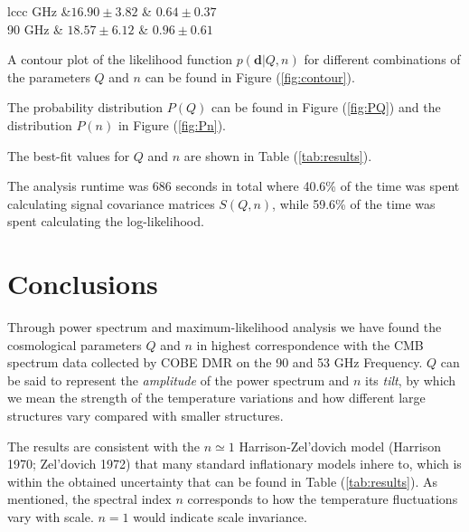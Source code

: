 \documentclass{emulateapj}
\begin{document}
\begin{deluxetable}{lccc}
	\tablecaption{\label{tab:results}}
	 GHz &$16.90 \pm 3.82$ & $0.64 \pm  0.37$ \\
	90 GHz & $ 18.57 \pm 6.12$ & $0.96 \pm 0.61$  \\
		\enddata
\end{deluxetable}

A contour plot of the likelihood function $p(\textbf{d}|Q,n)$ for different combinations of the parameters $Q$ and $n$ can be found in Figure (\ref{fig:contour}).

The probability distribution $P(Q)$ can be found in Figure (\ref{fig:PQ}) and the distribution $P(n)$ in Figure (\ref{fig:Pn}).

The best-fit values for $Q$ and $n$ are shown in Table (\ref{tab:results}).
 
The analysis runtime was 686 seconds in total where 40.6\% of the time was spent calculating signal covariance matrices $S(Q,n)$, while 59.6\% of the time was spent calculating the log-likelihood. 

 


\section{Conclusions}
\label{sec:conclusions}

Through power spectrum and maximum-likelihood analysis we have found the cosmological parameters $Q$ and $n$ in highest correspondence with the CMB spectrum data collected by COBE DMR on the 90 and 53 GHz Frequency. $Q$ can be said to represent the \textit{amplitude} of the power spectrum and $n$ its \textit{tilt}, by which we mean the strength of the temperature variations and how different large structures vary compared with smaller structures.

The results are consistent with the $n \simeq 1$ Harrison-Zel'dovich model (Harrison 1970; Zel'dovich 1972) that many standard inflationary models inhere to, which is within the obtained uncertainty that can be found in Table (\ref*{tab:results}). As mentioned, the spectral index $n$ corresponds to how the temperature fluctuations vary with scale. $n = 1$ would indicate scale invariance. 
\end{document}
